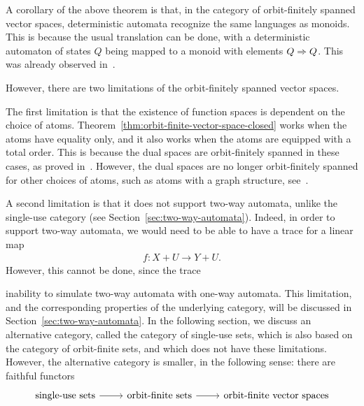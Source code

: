A corollary of the above theorem is that, in the category of orbit-finitely spanned vector spaces, deterministic automata recognize the same languages as monoids. This is because the usual translation can be done, with a deterministic automaton of states $Q$ being mapped to a monoid with elements $Q \Rightarrow Q$. This was already observed in~\cite[Theorem VIII.3]{bojanczykKM21OrbitFiniteVector}.

However, there are two limitations of the orbit-finitely spanned vector spaces. 

The first limitation is that the existence of function spaces is dependent on the choice of atoms. Theorem~\ref{thm:orbit-finite-vector-space-closed}  works when the atoms have equality only, and it also works when the atoms are equipped with a total order. This is because the dual spaces are orbit-finitely spanned in these cases, as proved in~\cite[Corollary VI.5]{bojanczykKM21OrbitFiniteVector}. However, the dual spaces are no longer orbit-finitely spanned for other choices of  atoms, such as atoms with a graph structure, see~\cite[Example 9]{bojanczykKM21OrbitFiniteVector}.

A second limitation is that it does not support two-way automata, unlike the single-use category (see Section~\ref{sec:two-way-automata}). Indeed, in order to support two-way automata, we would need to be able to have a trace for a linear map
\begin{align*}
f : X + U \to Y + U.
\end{align*}
However, this cannot be done, since the trace 

inability to simulate two-way automata with one-way automata. This limitation, and the corresponding properties of the underlying category, will be discussed in Section~\ref{sec:two-way-automata}. In the following section, we discuss an alternative category, called the category of single-use sets, which is also based on the category of orbit-finite sets, and which does not have these limitations. However, the alternative category is smaller, in the following sense: there are faithful functors 
\[
\begin{tikzcd}
\text{single-use sets} \ar[r, ] & 
\text{orbit-finite sets} \ar[r] &
\text{orbit-finite vector spaces}
\end{tikzcd}
\]